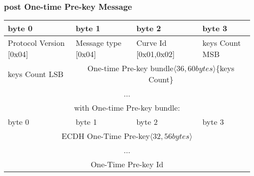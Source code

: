 \documentclass[a4paper,11pt]{article}
\begin{document}
    \subsubsection{post One-time Pre-key Message}
      \begin{center}
      \begin{tabular}{ | p{1.4in} | p{1.4in} | p{1.4in} | p{1.4in} |}
        \hline
        \cellcolor[gray]{0.85} byte 0 & \cellcolor[gray]{0.85} byte 1 & \cellcolor[gray]{0.85} byte 2 & \cellcolor[gray]{0.85}byte 3\\
        \hline
        Protocol Version [0x04] & Message type [0x04] & Curve Id [0x01,0x02] & keys Count MSB\\
        \hline
        keys Count LSB & \multicolumn{3}{|c|}{One-time Pre-key bundle$\langle 36,60bytes\rangle $\{keys Count\}}\\
        \cline{1-1}
        \multicolumn{4}{|c|}{...}\\
        \hline
        \multicolumn{4}{c}{with One-time Pre-key bundle:}\\
        \hline
        \cellcolor[gray]{0.95} byte 0 & \cellcolor[gray]{0.95} byte 1 & \cellcolor[gray]{0.95} byte 2 & \cellcolor[gray]{0.95}byte 3\\
        \hline
        \multicolumn{4}{|c|}{ECDH One-Time Pre-key$\langle 32,56bytes\rangle$}\\
        \multicolumn{4}{|c|}{...}\\
        \hline
        \multicolumn{4}{|c|}{One-Time Pre-key Id}\\
        \hline
      \end{tabular}
      \end{center}
     
\end{document}
